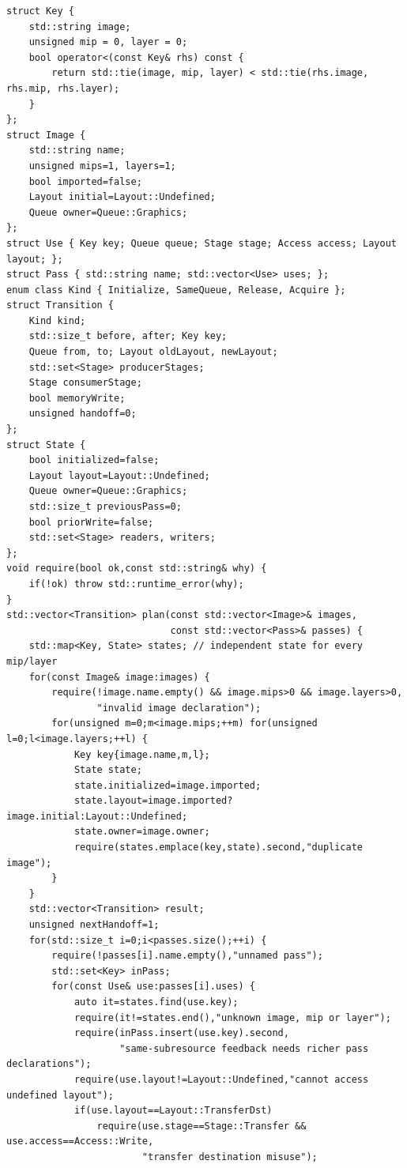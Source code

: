 \begin{verbatim}
struct Key {
    std::string image;
    unsigned mip = 0, layer = 0;
    bool operator<(const Key& rhs) const {
        return std::tie(image, mip, layer) < std::tie(rhs.image, rhs.mip, rhs.layer);
    }
};
struct Image {
    std::string name;
    unsigned mips=1, layers=1;
    bool imported=false;
    Layout initial=Layout::Undefined;
    Queue owner=Queue::Graphics;
};
struct Use { Key key; Queue queue; Stage stage; Access access; Layout layout; };
struct Pass { std::string name; std::vector<Use> uses; };
enum class Kind { Initialize, SameQueue, Release, Acquire };
struct Transition {
    Kind kind;
    std::size_t before, after; Key key;
    Queue from, to; Layout oldLayout, newLayout;
    std::set<Stage> producerStages;
    Stage consumerStage;
    bool memoryWrite;
    unsigned handoff=0;
};
struct State {
    bool initialized=false;
    Layout layout=Layout::Undefined;
    Queue owner=Queue::Graphics;
    std::size_t previousPass=0;
    bool priorWrite=false;
    std::set<Stage> readers, writers;
};
void require(bool ok,const std::string& why) {
    if(!ok) throw std::runtime_error(why);
}
std::vector<Transition> plan(const std::vector<Image>& images,
                             const std::vector<Pass>& passes) {
    std::map<Key, State> states; // independent state for every mip/layer
    for(const Image& image:images) {
        require(!image.name.empty() && image.mips>0 && image.layers>0,
                "invalid image declaration");
        for(unsigned m=0;m<image.mips;++m) for(unsigned l=0;l<image.layers;++l) {
            Key key{image.name,m,l};
            State state;
            state.initialized=image.imported;
            state.layout=image.imported?image.initial:Layout::Undefined;
            state.owner=image.owner;
            require(states.emplace(key,state).second,"duplicate image");
        }
    }
    std::vector<Transition> result;
    unsigned nextHandoff=1;
    for(std::size_t i=0;i<passes.size();++i) {
        require(!passes[i].name.empty(),"unnamed pass");
        std::set<Key> inPass;
        for(const Use& use:passes[i].uses) {
            auto it=states.find(use.key);
            require(it!=states.end(),"unknown image, mip or layer");
            require(inPass.insert(use.key).second,
                    "same-subresource feedback needs richer pass declarations");
            require(use.layout!=Layout::Undefined,"cannot access undefined layout");
            if(use.layout==Layout::TransferDst)
                require(use.stage==Stage::Transfer && use.access==Access::Write,
                        "transfer destination misuse");

\end{verbatim}
